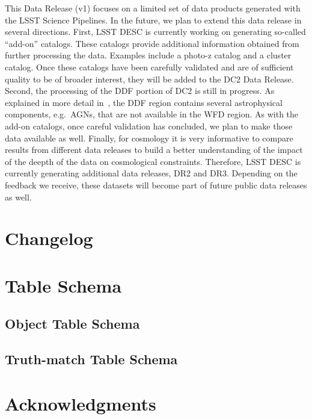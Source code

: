 \documentclass[modern]{descnote}
\begin{document}
This Data Release (v1) focuses on a limited set of data products generated with the LSST Science Pipelines. In the future, we plan to extend this data release in several directions. First, LSST DESC is currently working on generating so-called ``add-on'' catalogs. These catalogs provide additional information obtained from further processing the data. Examples include a photo-z catalog and a cluster catalog. Once these catalogs have been carefully validated and are of sufficient quality to be of broader interest, they will be added to the DC2 Data Release. Second, the processing of the DDF portion of DC2 is still in progress. As explained in more detail in~\cite{2020arXiv201005926L}, the DDF region contains several astrophysical components, e.g.~AGNs, that are not available in the WFD region. As with the add-on catalogs, once careful validation has concluded, we plan to make those data available as well. Finally, for cosmology it is very informative to compare results from different data releases to build a better understanding of the impact of the deepth of the data on cosmological constraints. Therefore, LSST DESC is currently generating additional data releases, DR2 and DR3. Depending on the feedback we receive, these datasets will become part of future public data releases as well.


\clearpage
\appendix
\section{Changelog}


\clearpage

\section{Table Schema}

\subsection{Object Table Schema}
\label{app:object-schema}


\bigskip

\subsection{Truth-match Table Schema}
\label{app:truth-schema}



\clearpage
\section*{Acknowledgments}
{}
\end{document}
